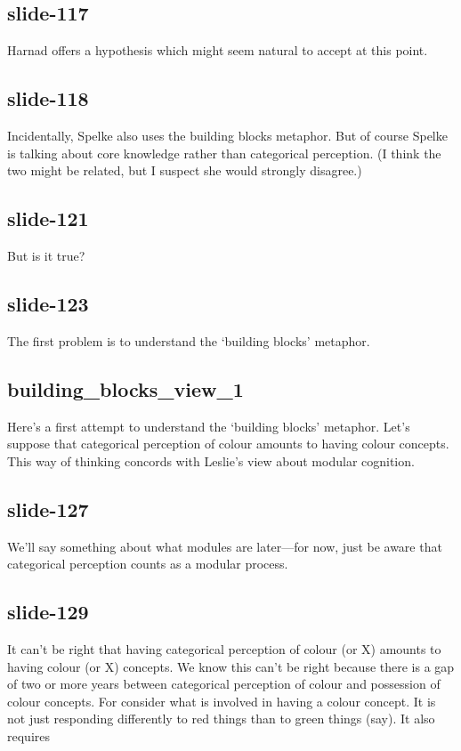 \documentclass[12pt,\papersize]{extarticle}
\begin{document}
 
\subsection{slide-117}
Harnad offers a hypothesis which might seem natural to accept at this point.
 
 
\subsection{slide-118}
Incidentally, Spelke also uses the building blocks metaphor.
But of course Spelke is talking about core knowledge rather than categorical perception. (I think the two might be related, but I suspect she would strongly disagree.)
 
 
\subsection{slide-121}
But is it true?
 
 
\subsection{slide-123}
The first problem is to understand the ‘building blocks’ metaphor.
 
 
\subsection{building\_blocks\_view\_1}
Here's a first attempt to understand the ‘building blocks’ metaphor.
Let's suppose that categorical perception of colour amounts to having colour concepts.
This way of thinking concords with Leslie's view about modular cognition.
 
 
\subsection{slide-127}
We'll say something about what modules are later---for now, just be aware that categorical perception counts as a modular process.
 
 
\subsection{slide-129}
It can't be right that having categorical perception of colour (or X) amounts to having colour (or X) concepts.
We know this can't be right because there is a gap of two or more years between categorical perception of colour and possession of colour concepts.
For consider what is involved in having a colour concept.
It is not just responding differently to red things than to green things (say).
It also requires
 
\end{document}
